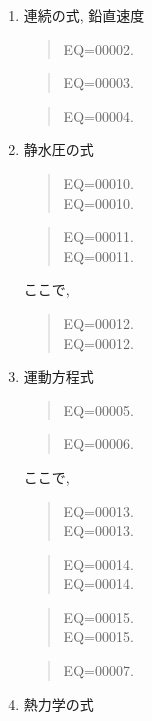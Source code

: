\begin{enumerate}
\item 連続の式, 鉛直速度

\begin{quote}
EQ=00002.
\end{quote}
%
\begin{quote}
EQ=00003.
\end{quote}
%
\begin{quote}
EQ=00004.
\end{quote}
   
\item 静水圧の式

\begin{quote}
EQ=00010.\\
\nonumber
EQ=00010.
\end{quote}
%
\begin{quote}
EQ=00011.\\
\nonumber
EQ=00011.
\end{quote}
%
ここで,
%
\begin{quote}
\label{静水圧係数}
EQ=00012.\\
EQ=00012.
\end{quote}

\item 運動方程式

\begin{quote}
EQ=00005.
\label{渦度結局}
\end{quote}
%
\begin{quote}
EQ=00006.
\end{quote}
%
ここで,
%
\begin{quote}
\nonumber
EQ=00013.\\
EQ=00013.
\end{quote}
%
\begin{quote}
\nonumber
EQ=00014.\\
EQ=00014.
\end{quote}
%
\begin{quote}
\label{はっとかっぱ}
\nonumber
EQ=00015.\\
EQ=00015.
\end{quote}

\begin{quote}
EQ=00007.
\end{quote}

\item 熱力学の式


\end{enumerate}
